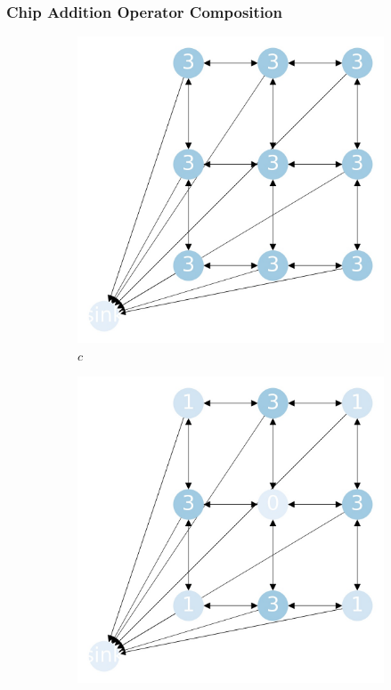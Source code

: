 \documentclass{beamer}
\begin{document}
\begin{frame}
\frametitle{Chip Addition Operator Composition}

  \begin{figure}[h!]
    \centering
    \begin{subfigure}[b]{0.3\linewidth}
      \includegraphics[width=\linewidth]{sandpile_chip_fire_0}
      \caption{$c$}
    \end{subfigure}
    \begin{subfigure}[b]{0.3\linewidth}
      \includegraphics[width=\linewidth]{sandpile_chip_fire_1}

\end{subfigure}
\end{figure}
\end{frame}
\end{document}
